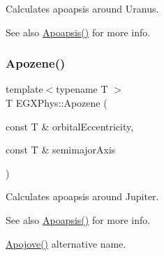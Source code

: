 Calculates apoapsis around Uranus. 

\begin{DoxySeeAlso}{See also}
\hyperlink{group___apoapsis_gaf962e650bf84a568458e8eb39b1c61ba}{Apoapsis()} for more info. 
\end{DoxySeeAlso}
\mbox{\label{group___apoapsis_ga44d3dd8d8b350d053b25b7b1f1e15534}} 
\subsubsection{\texorpdfstring{Apozene()}{Apozene()}}
{\footnotesize\ttfamily template$<$typename T $>$ \\
T E\+G\+X\+Phys\+::\+Apozene (\begin{DoxyParamCaption}\item[{const T \&}]{orbital\+Eccentricity,  }\item[{const T \&}]{semimajor\+Axis }\end{DoxyParamCaption})}



Calculates apoapsis around Jupiter. 

\begin{DoxySeeAlso}{See also}
\hyperlink{group___apoapsis_gaf962e650bf84a568458e8eb39b1c61ba}{Apoapsis()} for more info. 

\hyperlink{group___apoapsis_ga5a45d0a873514113aaa0adc95aefbbde}{Apojove()} alternative name. 
\end{DoxySeeAlso}
